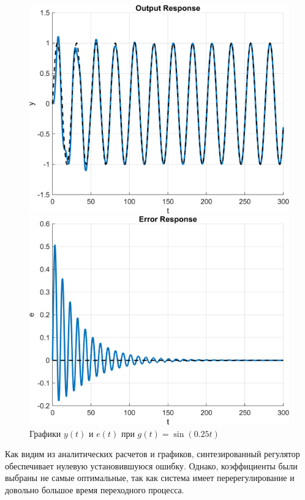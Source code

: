 \begin{figure}[H]
    \centering
    \begin{minipage}{0.45\textwidth}
        \centering
        \includegraphics[width=1\textwidth, trim={1cm 0cm 1cm 0cm}]{../images/6_1.png}
    \end{minipage}
    \hfill
    \begin{minipage}{0.45\textwidth}
        \centering
        \includegraphics[width=1\textwidth, trim={1cm 0cm 1cm 0cm}]{../images/6_2.png}
    \end{minipage}
    \caption{Графики $y(t)$ и $e(t)$ при $g(t) = \sin(0.25t)$}
\end{figure}

Как видим из аналитических расчетов и графиков, синтезированный регулятор 
обеспечивает нулевую установившуюся ошибку. Однако, коэффициенты были выбраны
не самые оптимальные, так как система имеет перерегулирование и довольно 
большое время переходного процесса.
\endinput